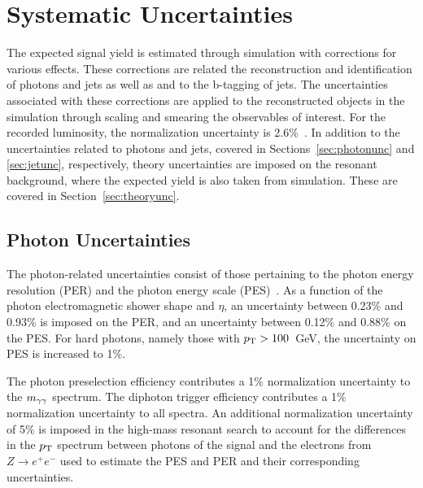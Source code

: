 \chapter{Systematic Uncertainties\label{ch:uncertainties}}

The expected signal yield is estimated through simulation with corrections for various effects.
These corrections are related the reconstruction and identification of photons and jets as well as
and to the b-tagging of jets.
The uncertainties associated with these corrections are applied to the reconstructed objects in
the simulation through scaling and smearing the observables of interest.
For the recorded luminosity, the normalization uncertainty is 2.6\%~\cite{CMS-PAS-LUM-13-001}.
In addition to the uncertainties related to photons and jets, covered in
Sections~\ref{sec:photonunc} and \ref{sec:jetunc}, respectively, theory uncertainties are imposed
on the resonant background, where the expected yield is also taken from simulation. These are covered
in Section~\ref{sec:theoryunc}.


\section{Photon Uncertainties\label{sec:photonunc}}

The photon-related uncertainties consist of those pertaining to the photon energy resolution (PER)
and the photon energy scale (PES)~\cite{CMS-PAS-HIG-13-001}. As a function of the photon
electromagnetic shower shape and $\eta$,
an uncertainty between 0.23\% and 0.93\% is imposed on the PER,
and an uncertainty between 0.12\% and 0.88\% on the PES. For hard photons, namely those with
$p_{{\rm T}} > 100$~GeV, the uncertainty on PES is increased to 1\%.

The photon preselection efficiency contributes a 1\% normalization uncertainty to the $m_{\gamma\gamma}$
spectrum. The diphoton trigger efficiency contributes a 1\% normalization
uncertainty to all spectra.
An additional normalization uncertainty of 5\% is imposed in the high-mass resonant search
to account for the differences in the $p_{\rm T}$ spectrum between photons of the signal
and the electrons from $Z\rightarrow e^+ e^-$ used to estimate the PES and PER and their
corresponding uncertainties.

